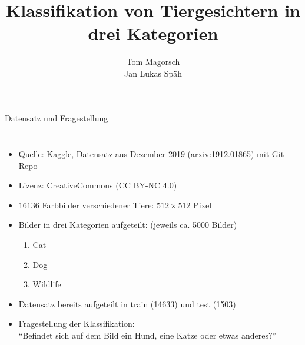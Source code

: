 \documentclass[aspectratio=1610, 9pt]{beamer}
\title{Klassifikation von Tiergesichtern in drei Kategorien}
\author[T.~Magorsch,~J.~L.~Späh]{Tom Magorsch\\ Jan Lukas Späh}
\institute[ML-Seminar]{\\[0.3cm]TU Dortmund \\ \Large ML-Seminar}
\begin{document}
\maketitle

\begin{frame}{Datensatz und Fragestellung}
  \begin{columns}


    \begin{itemize}
    \item Quelle: \href{https://www.kaggle.com/andrewmvd/animal-faces?}{Kaggle}, Datensatz aus Dezember 2019 (\href{https://arxiv.org/abs/1912.01865}{arxiv:1912.01865}) mit \href{https://github.com/clovaai/stargan-v2}{Git-Repo}
    \item Lizenz: CreativeCommons (CC BY-NC 4.0)
    \item $16136$ Farbbilder verschiedener Tiere: $512\times 512$ Pixel
    \item Bilder in drei Kategorien aufgeteilt: (jeweils ca. 5000 Bilder)
      \begin{enumerate}
      \item Cat
      \item Dog
      \item Wildlife
      \end{enumerate}
    \item Datensatz bereits aufgeteilt in train (14633) und test (1503)
    \item Fragestellung der Klassifikation:\\
    \rightarrow{} ``Befindet sich auf dem Bild ein Hund, eine Katze oder etwas anderes?''
    \end{itemize}


\end{columns}
\end{frame}
\end{document}
